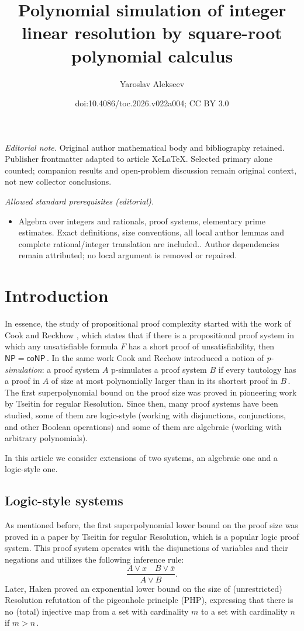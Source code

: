\documentclass[11pt]{article}
\title{Polynomial simulation of integer linear resolution by square-root polynomial calculus}
\author{Yaroslav Alekseev}
\date{doi:10.4086/toc.2026.v022a004; CC BY 3.0}
\begin{document}
\maketitle
\noindent\textit{Editorial note.} Original author mathematical body and bibliography retained. Publisher frontmatter adapted to article XeLaTeX. Selected primary alone counted; companion results and open-problem discussion remain original context, not new collector conclusions.\par\medskip
\noindent\textit{Allowed standard prerequisites (editorial).}\begin{itemize}
\item Algebra over integers and rationals, proof systems, elementary prime estimates. Exact definitions, size conventions, all local author lemmas and complete rational/integer translation are included.. Author dependencies remain attributed; no local argument is removed or repaired.
\end{itemize}\medskip
\section{Introduction}
In essence, the study of propositional proof complexity started with the work of Cook and Reckhow \cite{CR79}, which states that if there is a propositional proof system in which any unsatisfiable formula $F$ has a short proof of unsatisfiability, then %
$\mathsf{NP} = \mathsf{coNP}\,.$ %
 In the same work Cook and Rechow introduced a notion of \textit{p-simulation}: a proof system
$A$ p-simulates a proof system $B$ if every tautology has a proof in $A$ of size at most polynomially larger than in its shortest proof in %
$B\,.$ %
 The first %
  superpolynomial 
bound on the proof size was proved in %
pioneering work by  %
Tseitin \cite{Tse68} for regular %
Resolution. %
Since then, many proof systems have been studied, some of them are logic-style (working with disjunctions, conjunctions, and other Boolean operations) and some of them are algebraic (working with arbitrary polynomials).

In this %
article  %
we consider extensions of two systems, an algebraic one and a logic-style one. 

%
\subsection{Logic-style systems} %
As %
mentioned before, the first superpolynomial
lower  %
bound on the proof size was proved in %
a paper by  %
Tseitin for regular %
Resolution, %
%
which is a popular logic proof system. This proof system operates with the disjunctions of variables and their negations and utilizes the following inference rule:
$$
\frac{A \vee x \quad B \vee \overline{x}}{A \vee B}.
$$
Later, Haken \cite{Hak85} proved an exponential lower bound on the size of (unrestricted) Resolution refutation of the pigeonhole principle (PHP), expressing that there is no (total)
injective map from a set with cardinality $m$ to a set with cardinality $n$ if %
$m > n\,.$ %
\end{document}
